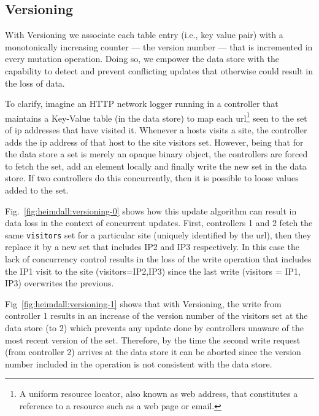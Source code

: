 \subsection {Versioning}
\label{sec:heimdall:versioning}

With Versioning we associate each table entry (i.e., key value pair)  with a monotonically increasing counter --- the version number ---   that is incremented in every mutation operation. 
Doing so, we empower the data store with the capability to detect and prevent conflicting updates that otherwise could result in the loss of data. 

To clarify, imagine an HTTP network logger running in a controller that maintains  a Key-Value table  (in the data store) to map each \gls{url}\footnote{A uniform resource locator, also known as web address,  that constitutes a reference to a resource such as a web page or email.} seen to the set of \gls{ip} addresses that have visited it. 
Whenever a hosts visits a site, the controller adds the \gls{ip} address of that host to the site visitors set. 
However, being that  for the data store a set is merely an opaque binary object, the controllers are forced to fetch the set, add an element locally and finally write the new set in the data store. If two controllers do this concurrently, then it is possible to loose values added to the set. 

Fig.~\ref{fig:heimdall:versioning-0} shows how this update algorithm can result in data loss in the context of concurrent updates. 
First, controllers 1 and 2 fetch the same \texttt{visitors} set for a particular site (uniquely identified by the \gls{url}), then they replace it by a new set that includes IP2 and IP3 respectively. 
In this case the lack of concurrency control  results in the loss of the write operation that includes the IP1 visit to the site (visitors={IP2,IP3})  since the  last write (visitors = {IP1, IP3}) overwrites the previous. 

Fig~\ref{fig:heimdall:versioning-1} shows that with Versioning, the write from controller 1 results in an increase of the version number of the visitors set at the data store (to 2) which prevents any update done by controllers unaware of the most recent version of the set. 
Therefore, by the time the second write request (from controller 2) arrives at the data store it can be aborted since  the version number included in the operation is not consistent with the data store. 

